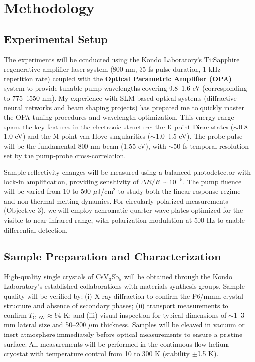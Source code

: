 \documentclass[12pt,a4paper]{article}
\begin{document}
\section{Methodology}

\subsection{Experimental Setup}
The experiments will be conducted using the Kondo Laboratory's Ti:Sapphire regenerative amplifier laser system (800 nm, 35 fs pulse duration, 1 kHz repetition rate) coupled with the \textbf{Optical Parametric Amplifier (OPA)} system to provide tunable pump wavelengths covering 0.8--1.6 eV (corresponding to 775--1550 nm). My experience with SLM-based optical systems (diffractive neural networks and beam shaping projects) has prepared me to quickly master the OPA tuning procedures and wavelength optimization. This energy range spans the key features in the electronic structure: the K-point Dirac states ($\sim$0.8--1.0 eV) and the M-point van Hove singularities ($\sim$1.0--1.5 eV). The probe pulse will be the fundamental 800 nm beam (1.55 eV), with $\sim$50 fs temporal resolution set by the pump-probe cross-correlation.

Sample reflectivity changes will be measured using a balanced photodetector with lock-in amplification, providing sensitivity of $\Delta R/R \sim 10^{-5}$. The pump fluence will be varied from 10 to 500 $\mu$J/cm$^2$ to study both the linear response regime and non-thermal melting dynamics. For circularly-polarized measurements (Objective 3), we will employ achromatic quarter-wave plates optimized for the visible to near-infrared range, with polarization modulation at 500 Hz to enable differential detection.

\subsection{Sample Preparation and Characterization}
High-quality single crystals of CsV$_3$Sb$_5$ will be obtained through the Kondo Laboratory's established collaborations with materials synthesis groups. Sample quality will be verified by: (i) X-ray diffraction to confirm the P6/mmm crystal structure and absence of secondary phases; (ii) transport measurements to confirm $T_{\text{CDW}} \approx 94$ K; and (iii) visual inspection for typical dimensions of $\sim$1--3 mm lateral size and 50--200 $\mu$m thickness. Samples will be cleaved in vacuum or inert atmosphere immediately before optical measurements to ensure a pristine surface. All measurements will be performed in the continuous-flow helium cryostat with temperature control from 10 to 300 K (stability $\pm$0.5 K).
\end{document}
